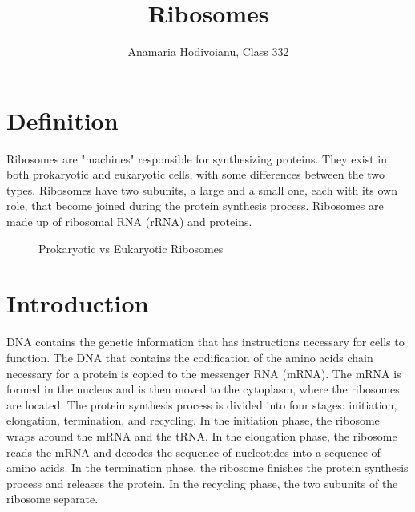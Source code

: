 \documentclass{article}
\title{Ribosomes}
\author{Anamaria Hodivoianu, Class 332}
\begin{document}
\maketitle

\section{Definition}
Ribosomes are "machines" responsible for synthesizing proteins. They exist in both prokaryotic and eukaryotic cells, with some differences between the two types. Ribosomes have two subunits, a large and a small one, each with its own role, that become joined during the protein synthesis process. Ribosomes are made up of ribosomal RNA (rRNA) and proteins.

\begin{figure}
    \centering
    \hspace{0.05\textwidth}
    \caption{Prokaryotic vs Eukaryotic Ribosomes}
\end{figure}

\section{Introduction}
DNA contains the genetic information that has instructions necessary for cells to function. The DNA that contains the codification of the amino acids chain necessary for a protein is copied to the messenger RNA (mRNA). The mRNA is formed in the nucleus and is then moved to the cytoplasm, where the ribosomes are located. The protein synthesis process is divided into four stages: initiation, elongation, termination, and recycling. In the initiation phase, the ribosome wraps around the mRNA and the tRNA. In the elongation phase, the ribosome reads the mRNA and decodes the sequence of nucleotides into a sequence of amino acids. In the termination phase, the ribosome finishes the protein synthesis process and releases the protein. In the recycling phase, the two subunits of the ribosome separate.
\end{document}
